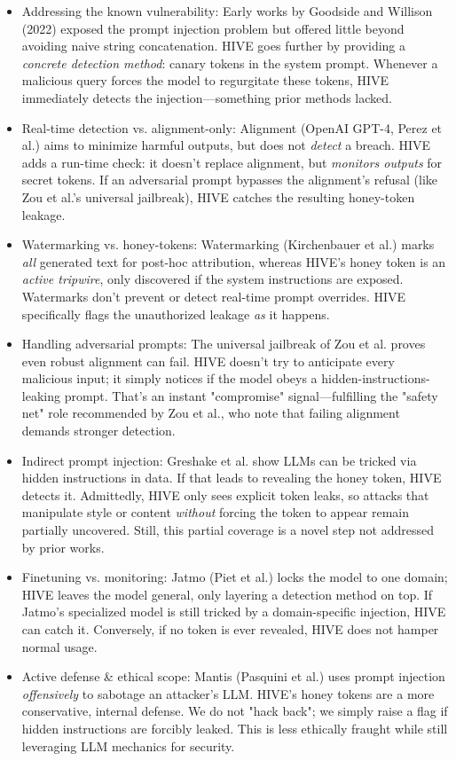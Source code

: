 \documentclass[manuscript,screen,review]{acmart}
\begin{document}
\begin{itemize} 
\item Addressing the known vulnerability: Early works by Goodside and Willison (2022) exposed the prompt injection problem but offered little beyond avoiding naive string concatenation. HIVE goes further by providing a \textit{concrete detection method}: canary tokens in the system prompt. Whenever a malicious query forces the model to regurgitate these tokens, HIVE immediately detects the injection—something prior methods lacked.
\item Real-time detection vs. alignment-only: Alignment (OpenAI GPT-4, Perez et al.) aims to minimize harmful outputs, but does not \textit{detect} a breach. HIVE adds a run-time check: it doesn't replace alignment, but \textit{monitors outputs} for secret tokens. If an adversarial prompt bypasses the alignment's refusal (like Zou et al.'s universal jailbreak), HIVE catches the resulting honey-token leakage. 

\item Watermarking vs. honey-tokens: Watermarking (Kirchenbauer et al.) marks \textit{all} generated text for post-hoc attribution, whereas HIVE's honey token is an \textit{active tripwire}, only discovered if the system instructions are exposed. Watermarks don't prevent or detect real-time prompt overrides. HIVE specifically flags the unauthorized leakage \textit{as} it happens.

\item Handling adversarial prompts: The universal jailbreak of Zou et al. proves even robust alignment can fail. HIVE doesn't try to anticipate every malicious input; it simply notices if the model obeys a hidden-instructions-leaking prompt. That's an instant "compromise" signal—fulfilling the "safety net" role recommended by Zou et al., who note that failing alignment demands stronger detection.

\item Indirect prompt injection: Greshake et al. show LLMs can be tricked via hidden instructions in data. If that leads to revealing the honey token, HIVE detects it. Admittedly, HIVE only sees explicit token leaks, so attacks that manipulate style or content \textit{without} forcing the token to appear remain partially uncovered. Still, this partial coverage is a novel step not addressed by prior works.

\item Finetuning vs. monitoring: Jatmo (Piet et al.) locks the model to one domain; HIVE leaves the model general, only layering a detection method on top. If Jatmo's specialized model is still tricked by a domain-specific injection, HIVE can catch it. Conversely, if no token is ever revealed, HIVE does not hamper normal usage.

\item Active defense \& ethical scope: Mantis (Pasquini et al.) uses prompt injection \textit{offensively} to sabotage an attacker's LLM. HIVE's honey tokens are a more conservative, internal defense. We do not "hack back"; we simply raise a flag if hidden instructions are forcibly leaked. This is less ethically fraught while still leveraging LLM mechanics for security.
\end{itemize}
\end{document}
